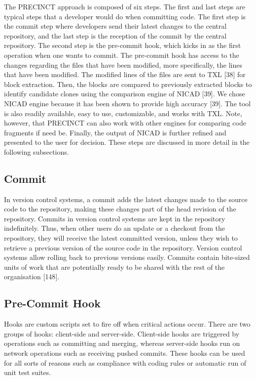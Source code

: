 \documentclass[12pt]{report}
\begin{document}
The PRECINCT approach is composed of six steps. The first and last steps
are typical steps that a developer would do when committing code. The
first step is the commit step where developers send their latest changes
to the central repository, and the last step is the reception of the
commit by the central repository. The second step is the pre-commit
hook, which kicks in as the first operation when one wants to commit.
The pre-commit hook has access to the changes regarding the files that
have been modified, more specifically, the lines that have been
modified. The modified lines of the files are sent to TXL {[}38{]} for
block extraction. Then, the blocks are compared to previously extracted
blocks to identify candidate clones using the comparison engine of NICAD
{[}39{]}. We chose NICAD engine because it has been shown to provide
high accuracy {[}39{]}. The tool is also readily available, easy to use,
customizable, and works with TXL. Note, however, that PRECINCT can also
work with other engines for comparing code fragments if need be.
Finally, the output of NICAD is further refined and presented to the
user for decision. These steps are discussed in more detail in the
following subsections.

\subsection{Commit}\label{commit}

In version control systems, a commit adds the latest changes made to the
source code to the repository, making these changes part of the head
revision of the repository. Commits in version control systems are kept
in the repository indefinitely. Thus, when other users do an update or a
checkout from the repository, they will receive the latest committed
version, unless they wish to retrieve a previous version of the source
code in the repository. Version control systems allow rolling back to
previous versions easily. Commits contain bite-sized units of work that
are potentially ready to be shared with the rest of the organisation
{[}148{]}.

\subsection{Pre-Commit Hook}\label{pre-commit-hook}

Hooks are custom scripts set to fire off when critical actions occur.
There are two groups of hooks: client-side and server-side. Client-side
hooks are triggered by operations such as committing and merging,
whereas server-side hooks run on network operations such as receiving
pushed commits. These hooks can be used for all sorts of reasons such as
compliance with coding rules or automatic run of unit test suites.
\end{document}
